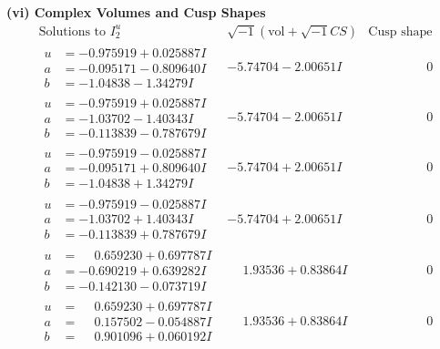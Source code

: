\documentclass[1p]{elsarticle_modified}
\theoremstyle{definition}
\newcommand{\I}{\sqrt{-1}}
\begin{document}
\newpage\flushleft \textbf{(vi) Complex Volumes and Cusp Shapes}
$$\begin{array}{c|c|c}  
\text{Solutions to }I^u_{2}& \I (\text{vol} + \sqrt{-1}CS) & \text{Cusp shape}\\
 \hline 
\begin{aligned}
u &= -0.975919 + 0.025887 I \\
a &= -0.095171 - 0.809640 I \\
b &= -1.04838 - 1.34279 I\end{aligned}
 & -5.74704 - 2.00651 I & \phantom{-0.000000 } 0 \\ \hline\begin{aligned}
u &= -0.975919 + 0.025887 I \\
a &= -1.03702 - 1.40343 I \\
b &= -0.113839 - 0.787679 I\end{aligned}
 & -5.74704 - 2.00651 I & \phantom{-0.000000 } 0 \\ \hline\begin{aligned}
u &= -0.975919 - 0.025887 I \\
a &= -0.095171 + 0.809640 I \\
b &= -1.04838 + 1.34279 I\end{aligned}
 & -5.74704 + 2.00651 I & \phantom{-0.000000 } 0 \\ \hline\begin{aligned}
u &= -0.975919 - 0.025887 I \\
a &= -1.03702 + 1.40343 I \\
b &= -0.113839 + 0.787679 I\end{aligned}
 & -5.74704 + 2.00651 I & \phantom{-0.000000 } 0 \\ \hline\begin{aligned}
u &= \phantom{-}0.659230 + 0.697787 I \\
a &= -0.690219 + 0.639282 I \\
b &= -0.142130 - 0.073719 I\end{aligned}
 & \phantom{-}1.93536 + 0.83864 I & \phantom{-0.000000 } 0 \\ \hline\begin{aligned}
u &= \phantom{-}0.659230 + 0.697787 I \\
a &= \phantom{-}0.157502 - 0.054887 I \\
b &= \phantom{-}0.901096 + 0.060192 I\end{aligned}
 & \phantom{-}1.93536 + 0.83864 I & \phantom{-0.000000 } 0 \\ \hline\begin{aligned}

\end{aligned}
\end{array}$$
\end{document}
